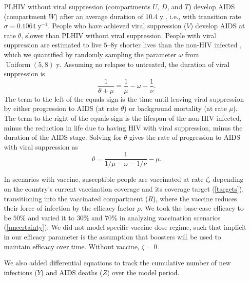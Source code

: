 \documentclass{article}
\DeclareMathOperator{\Uniform}{Uniform}
\begin{document}
PLHIV without viral suppression (compartments $U$, $D$, and $T$)
develop AIDS (compartment $W$) after an average duration of 10.4 y
\cite{Morgan2002-cq}, i.e., with transition rate
$\sigma = 0.1064\;\text{y$^{-1}$}$.  People who have achieved viral
suppression ($V$) develop AIDS at rate $\theta$, slower than PLHIV
without viral suppression.  People with viral suppression are
estimated to live $5$--$8$\;y shorter lives than the non-HIV infected
\cite{Unaids2014-ue, Samji2013-kf}, which we quantified by randomly
sampling the parameter $\omega$ from $\Uniform(5, 8)\;\text{y}$.
Assuming no relapse to untreated, the duration of viral suppression is
\begin{equation}
  \frac{1}{\theta + \mu} = \frac{1}{\mu} - \omega - \frac{1}{\nu}.
\end{equation}
The term to the left of the equals sign is the time until leaving
viral suppression by either progression to AIDS (at rate $\theta$) or
background mortality (at rate $\mu$).  The term to the right of the
equals sign is the lifespan of the non-HIV infected, minus the
reduction in life due to having HIV with viral suppression, minus the
duration of the AIDS stage.  Solving for $\theta$ gives the rate of
progression to AIDS with viral suppression as
\begin{equation}
  \label{theta}
  \theta = \frac{1}{1/\mu - \omega - 1/\nu} - \mu.
\end{equation}

In scenarios with vaccine, susceptible people are vaccinated at rate
$\zeta$, depending on the country's current vaccination coverage and
its coverage target (\autoref{targets}), transitioning into the
vaccinated compartment ($R$), where the vaccine reduces their force of
infection by the efficacy factor $\rho$.  We took the base-case
efficacy to be $50\%$ and varied it to $30\%$ and $70\%$ in analyzing
vaccination scenarios (\autoref{uncertainty}).  We did not model
specific vaccine dose regime, such that implicit in our efficacy
parameter is the assumption that boosters will be used to maintain
efficacy over time.  Without vaccine, $\zeta = 0$.

We also added differential equations to track the cumulative number of
new infections ($Y$) and AIDS deaths ($Z$) over the model period.
\end{document}
